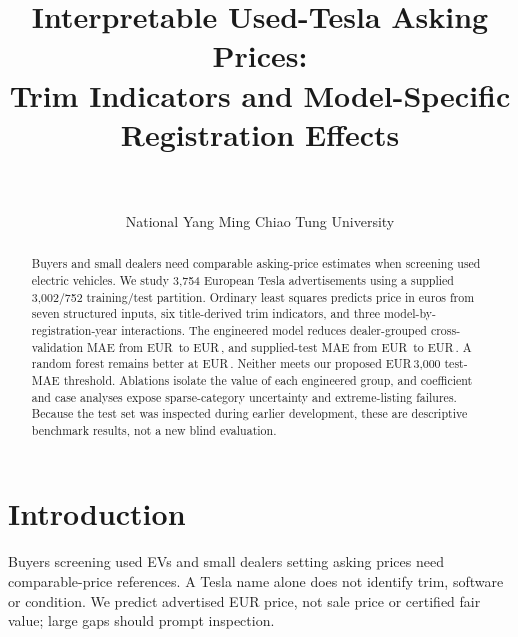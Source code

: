 \usepackage{times,latexsym}
\usepackage{fontspec}
\newcommand{\cn}[1]{{\chinesefont #1}}
\usepackage{graphicx,booktabs,amsmath,amssymb,array,tabularx}


\newcommand{\eur}{EUR\,}
\title{Interpretable Used-Tesla Asking Prices:\\Trim Indicators and Model-Specific Registration Effects}
\ifdefined\judgeversion
\author{\teamid}
\else
\author{\teamid\\\members\\National Yang Ming Chiao Tung University\\\repoline}
\fi
{}
\setlength{\textfloatsep}{8pt plus 2pt minus 2pt}
\setlength{\intextsep}{8pt plus 2pt minus 2pt}

\maketitle
\begin{abstract}
Buyers and small dealers need comparable asking-price estimates when screening used electric vehicles. We study 3,754 European Tesla advertisements using a supplied 3,002/752 training/test partition. Ordinary least squares predicts price in euros from seven structured inputs, six title-derived trim indicators, and three model-by-registration-year interactions. The engineered model reduces dealer-grouped cross-validation MAE from \eur\GroupA{} to \eur\GroupC{}, and supplied-test MAE from \eur\TestA{} to \eur\TestC{}. A random forest remains better at \eur\TestRF{}. Neither meets our proposed \eur3,000 test-MAE threshold. Ablations isolate the value of each engineered group, and coefficient and case analyses expose sparse-category uncertainty and extreme-listing failures. Because the test set was inspected during earlier development, these are descriptive benchmark results, not a new blind evaluation.
\end{abstract}

\section{Introduction}
Buyers screening used EVs and small dealers setting asking prices need comparable-price references. A Tesla name alone does not identify trim, software or condition. We predict advertised EUR price, not sale price or certified fair value; large gaps should prompt inspection.

